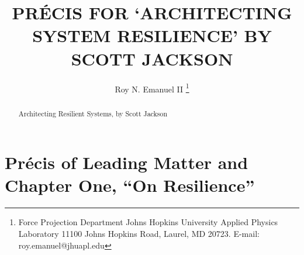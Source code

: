 \documentclass[Proceedings]{ascelike}
\begin{document}
%
\title{PR\'{E}CIS FOR `ARCHITECTING SYSTEM RESILIENCE' BY SCOTT JACKSON}
%
\author{
Roy N. Emanuel II%
%
\thanks{
Force Projection Department
Johns Hopkins University Applied Physics Laboratory
11100 Johns Hopkins Road, 
Laurel, MD 20723. E-mail: roy.emanuel@jhuapl.edu}
%
%
%
%
%
%
}
%
\maketitle
%
\begin{abstract}
Architecting Resilient Systems, by Scott Jackson 
\end{abstract}
%
%
%
\section{Pr\'{e}cis of Leading Matter and Chapter One, ``On
  Resilience''}
\end{document}
